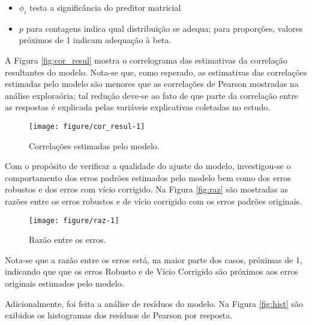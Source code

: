 \begin{itemize}
  \item $\phi_{i}$ testa a significância do preditor matricial
  \item $p$ para contagens indica qual distribuição se adequa; para proporções, valores próximos de 1 indicam adequação à beta.
\end{itemize}

A Figura \autoref{fig:cor_resul} mostra o correlograma das estimativas da correlação resultantes do modelo. Nota-se que, como esperado, as estimativas das correlações estimadas pelo modelo são menores que as correlações de Pearson mostradas na análise exploraória; tal redução deve-se ao fato de que parte da correlação entre as respostas é explicada pelas variáveis explicativas coletadas no estudo.

\begin{knitrout}
\color{fgcolor}\begin{figure}[H]
\texttt{[image: figure/cor\_resul-1]} \caption[Correlações estimadas pelo modelo]{Correlações estimadas pelo modelo.}\label{fig:cor_resul}
\end{figure}


\end{knitrout}

Com o propósito de verificar a qualidade do ajuste do modelo, investigou-se o comportamento dos erros padrões estimados pelo modelo bem como dos erros robustos e dos erros com vício corrigido. Na Figura \autoref{fig:raz} são mostradas as razões entre os erros robustos e de vício corrigido com os erros padrões originais.



\begin{knitrout}
\color{fgcolor}\begin{figure}[H]
\texttt{[image: figure/raz-1]} \caption[Razão entre os erros]{Razão entre os erros.}\label{fig:raz}
\end{figure}


\end{knitrout}

Nota-se que a razão entre os erros está, na maior parte dos casos, próximas de 1, indicando que que os erros Robusto e de Vício Corrigido são próximos aos erros originais estimados pelo modelo.

Adicionalmente, foi feita a análise de resíduos do modelo. Na Figura \autoref{fig:hist} são exibidos os histogramas dos resíduos de Pearson por 
resposta.

